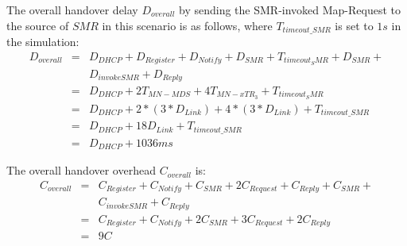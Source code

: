 {The overall handover delay $D_{overall}$ by sending the SMR-invoked Map-Request to the source of $SMR$ in this scenario is as follows, where $T_{timeout\_SMR}$ is set to $1 s$ in the simulation:
\begin{eqnarray}
D_{overall} &=& D_{DHCP} + D_{Register} + D_{Notify} + D_{SMR} + T_{timeout_SMR} + D_{SMR} +  \nonumber \\
& & D_{invokeSMR} + D_{Reply} \nonumber \\
&=& D_{DHCP} + 2T_{MN-MDS} + 4T_{MN-xTR_3} + T_{timeout_SMR}\nonumber \\
&=& D_{DHCP} + 2* (3*D_{Link}) + 4*(3*D_{Link}) + T_{timeout\_SMR} \nonumber \\
&=& D_{DHCP} + 18D_{Link} + T_{timeout\_SMR}  \\
&=& D_{DHCP} + 1036 ms \nonumber
\end{eqnarray}

The overall handover overhead $C_{overall}$ is:
\begin{eqnarray}
C_{overall} &=& C_{Register} + C_{Notify} + C_{SMR} + 2C_{Request} + C_{Reply} + C_{SMR} +  \nonumber \\
& & C_{invokeSMR} + C_{Reply} \nonumber \\
&=& C_{Register} + C_{Notify} + 2C_{SMR} + 3C_{Request} + 2C_{Reply}  \nonumber \\
&=& 9 C
\end{eqnarray}

}

